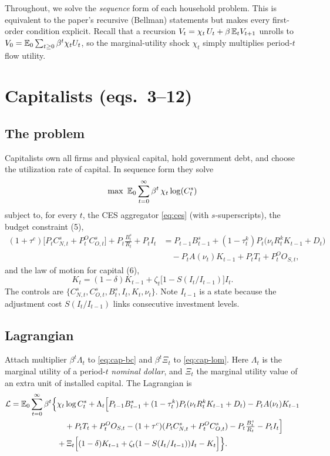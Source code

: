 Throughout, we solve the \emph{sequence} form of each household problem. This is equivalent to the
paper's recursive (Bellman) statements but makes every first-order condition explicit. Recall that a
recursion $V_t=\chi_t\,U_t+\beta\,\mathbb{E}_t V_{t+1}$ unrolls to
$V_0=\mathbb{E}_0\sum_{t\ge0}\beta^t\chi_t U_t$, so the marginal-utility shock $\chi_t$ simply multiplies
period-$t$ flow utility.

\section{Capitalists (eqs.\ 3--12)}

\subsection{The problem}
Capitalists own all firms and physical capital, hold government debt, and choose the utilization
rate of capital. In sequence form they solve
\begin{equation}\label{eq:cap-obj}
\max\ \mathbb{E}_0\sum_{t=0}^\infty \beta^t\,\chi_t\log(C^s_t)
\end{equation}
subject to, for every $t$, the CES aggregator \eqref{eq:ces} (with $s$-superscripts), the budget
constraint (5),
\begin{align}
(1+\tau^c)\big[P_t C^s_{N,t}+P^O_t C^s_{O,t}\big]+P_t\frac{B^s_t}{R_t}+P_t I_t
&=P_{t-1}B^s_{t-1}+(1-\tau^k_t)P_t\big(\nu_t R^k_t K_{t-1}+D_t\big)\nonumber\\
&\quad-P_t A(\nu_t)K_{t-1}+P_t T_t+P^O_t O_{S,t},\tag{P-5}\label{eq:cap-bc}
\end{align}
and the law of motion for capital (6),
\begin{equation}\label{eq:cap-lom}
K_t=(1-\delta)K_{t-1}+\zeta_t\big[1-S(I_t/I_{t-1})\big]I_t .
\tag{P-6}
\end{equation}
The controls are $\{C^s_{N,t},C^s_{O,t},B^s_t,I_t,K_t,\nu_t\}$. Note $I_{t-1}$ is a state because
the adjustment cost $S(I_t/I_{t-1})$ links consecutive investment levels.

\subsection{Lagrangian}
Attach multiplier $\beta^t\Lambda_t$ to \eqref{eq:cap-bc} and $\beta^t\Xi_t$ to \eqref{eq:cap-lom}.
Here $\Lambda_t$ is the marginal utility of a period-$t$ \emph{nominal dollar}, and $\Xi_t$ the
marginal utility value of an extra unit of installed capital. The Lagrangian is
\begin{align}
\mathcal L=\mathbb{E}_0\sum_{t=0}^\infty \beta^t\Big\{&\chi_t\log C^s_t
+\Lambda_t\Big[P_{t-1}B^s_{t-1}+(1-\tau^k_t)P_t(\nu_t R^k_t K_{t-1}+D_t)-P_tA(\nu_t)K_{t-1}\nonumber\\
&\quad+P_tT_t+P^O_tO_{S,t}-(1+\tau^c)(P_tC^s_{N,t}+P^O_tC^s_{O,t})-P_t\tfrac{B^s_t}{R_t}-P_tI_t\Big]\nonumber\\
&+\Xi_t\Big[(1-\delta)K_{t-1}+\zeta_t(1-S(I_t/I_{t-1}))I_t-K_t\Big]\Big\}.\label{eq:cap-lag}
\end{align}

